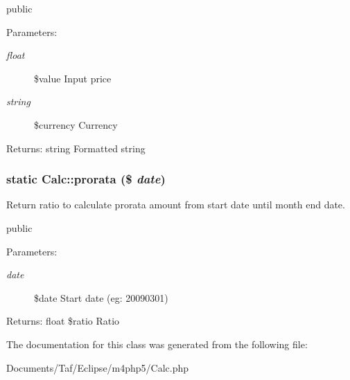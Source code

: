 public \begin{Desc}
\item[Parameters:]
\begin{description}
\item[{\em float}]\$value Input price \item[{\em string}]\$currency Currency \end{description}
\end{Desc}
\begin{Desc}
\item[Returns:]string Formatted string \end{Desc}
\hypertarget{classCalc_9d9aafb8e61efce896ca20bc0d2a32e3}{
\subsubsection[prorata]{\setlength{\rightskip}{0pt plus 5cm}static Calc::prorata (\$ {\em date})}}
\label{classCalc_9d9aafb8e61efce896ca20bc0d2a32e3}


Return ratio to calculate prorata amount from start date until month end date.

public \begin{Desc}
\item[Parameters:]
\begin{description}
\item[{\em date}]\$date Start date (eg: 20090301) \end{description}
\end{Desc}
\begin{Desc}
\item[Returns:]float \$ratio Ratio \end{Desc}


The documentation for this class was generated from the following file:\begin{CompactItemize}
\item 
Documents/Taf/Eclipse/m4php5/Calc.php\end{CompactItemize}
